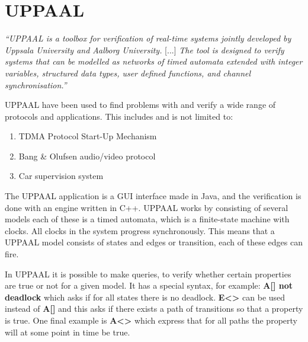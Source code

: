 \section{UPPAAL}\label{subsec:uppaal}
\begin{tcolorbox}[floatplacement=b,float,colback=white!5,colframe=aaublue!50,title=What is UPPAAL? \cite{tutorial04}]
\textit{``UPPAAL is a toolbox for verification of real-time systems jointly developed by Uppsala University and Aalborg University.} [...] \textit{The tool is designed to verify systems that can be modelled as networks of timed automata extended with integer variables, structured data types, user defined functions, and channel synchronisation.''}
\end{tcolorbox} 

UPPAAL have been used to find problems with and verify a wide range of protocols and applications. 
This includes and is not limited to: 
\begin{enumerate}[label=\itshape \alph*\upshape)]
    \item TDMA Protocol Start-Up Mechanism \cite{Lonn:1997:FVT:826040.827011}
    \item Bang \& Olufsen audio/video protocol \cite{Havelund97formalmodeling}
    \item Car supervision system \cite{gebremichael2004formal}
\end{enumerate}
The UPPAAL application is a GUI interface made in Java, and the verification is done with an engine written in C++. 
UPPAAL works by consisting of several models each of these is a timed automata, which is a finite-state machine with clocks. 
All clocks in the system progress synchronously. 
This means that a UPPAAL model consists of states and edges or transition, each of these edges can fire. 

In UPPAAL it is possible to make queries, to verify whether certain properties are true or not for a given model.
It has a special syntax, for example: \textbf{A[] not deadlock} which asks if for all states there is no deadlock.
\textbf{E<>} can be used instead of \textbf{A[]} and this asks if there exists a path of transitions so that a property is true.
One final example is \textbf{A<>} which express that for all paths the property will at some point in time be true.
